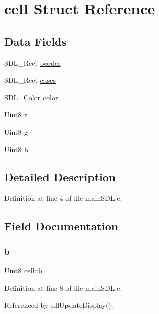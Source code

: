 \hypertarget{structcell}{}\section{cell Struct Reference}
\label{structcell}
\subsection*{Data Fields}
\begin{DoxyCompactItemize}
\item 
S\+D\+L\+\_\+\+Rect \hyperlink{structcell_ae289d5dfc43a03b47de6dffa417776df}{border}
\item 
S\+D\+L\+\_\+\+Rect \hyperlink{structcell_af2fb9745b37f309905e02fed903748a5}{cases}
\item 
S\+D\+L\+\_\+\+Color \hyperlink{structcell_a17634ccb0012ada2dc1f042314d35c21}{color}
\item 
Uint8 \hyperlink{structcell_a8cefee0153ea06b2465c1142c467b3e0}{r}
\item 
Uint8 \hyperlink{structcell_ac8a350a38ff279748cfe301a30c8878f}{g}
\item 
Uint8 \hyperlink{structcell_a370fd46cdbe470096b56b9c53941eb0e}{b}
\end{DoxyCompactItemize}


\subsection{Detailed Description}


Definition at line 4 of file main\+S\+D\+L.\+c.



\subsection{Field Documentation}
\mbox{\label{structcell_a370fd46cdbe470096b56b9c53941eb0e}} 
\subsubsection{\texorpdfstring{b}{b}}
{\footnotesize\ttfamily Uint8 cell\+::b}



Definition at line 8 of file main\+S\+D\+L.\+c.



Referenced by sdl\+Update\+Display().

